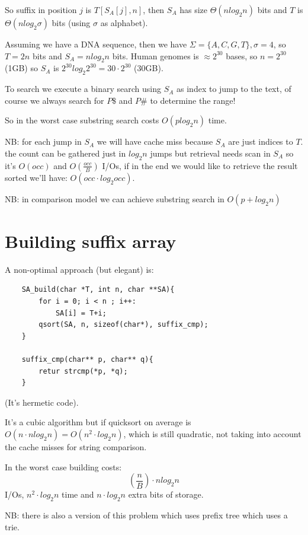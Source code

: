 So suffix in position $j$ is $T[S_A[j], n]$, then $S_A$ has size $\Theta(n log_2 n)$ bits and $T$ is $\Theta(n log_2 \sigma)$ bits (using $\sigma$ as alphabet).

Assuming we have a DNA sequence, then we have $\Sigma = \{A, C, G, T\}, \sigma=4$, so $T = 2n$ bits and $S_A = n log_2 n$ bits.
Human genomes is $\approx 2^{30}$ bases, so $n = 2^30$ (1GB) so $S_A$ is $2^{30} log_2 2^{30} = 30 \cdot 2^{30}$ (30GB).

To search we execute a binary search using $S_A$ as index to jump to the text, of course we always search for $P\$$ and $P\#$ to determine the range!

So in the worst case substring search costs $O(p log_2 n)$ time.

NB: for each jump in $S_A$ we will have cache miss because $S_A$ are just indices to $T$.
the count can be gathered just in $log_2 n$ jumps but retrieval needs scan in $S_A$ so it's $O(occ)$ and $O(\frac{occ}{B})$ I/Os, if in the end we would like to retrieve the result sorted we'll have: $O(occ \cdot log_2 occ)$.

NB: in comparison model we can achieve substring search in $O(p + log_2 n)$

\section{Building suffix array}
A non-optimal approach (but elegant) is:
\begin{verbatim}
    SA_build(char *T, int n, char **SA){
        for i = 0; i < n ; i++:
            SA[i] = T+i;
        qsort(SA, n, sizeof(char*), suffix_cmp);
    }

    suffix_cmp(char** p, char** q){
        retur strcmp(*p, *q);
    }
\end{verbatim}
(It's hermetic code).

It's a cubic algorithm but if quicksort on average is $O(n \cdot n log_2 n) = O(n^2 \cdot log_2 n)$, which is still quadratic, not taking into account the cache misses for string comparison.

In the worst case building costs:
$$
    \left( \frac{n}{B} \right) \cdot n log_2 n
$$
I/Os, $n^2 \cdot log_2 n$ time and $n \cdot log_2 n$ extra bits of storage.

NB: there is also a version of this problem which uses prefix tree which uses a trie.

